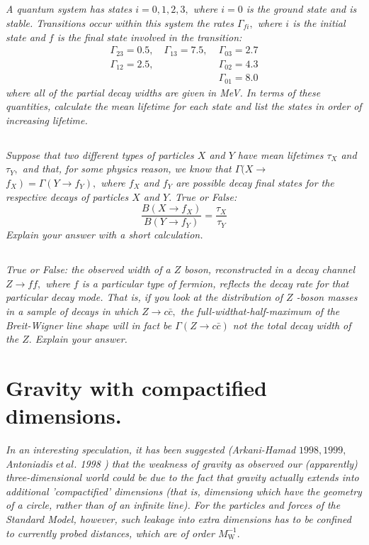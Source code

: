 \documentclass{article}
\begin{document}
\subsection{}
\textit{A quantum system has states $i=0,1,2,3,$ where $i=0$ is the ground state and is stable. Transitions occur within this system the rates $\Gamma_{f i},$ where $i$ is the initial state and $f$ is the final state involved in the transition:
$$
\begin{aligned}
\Gamma_{23}=0.5, \quad \Gamma_{13}=7.5, \;& \Gamma_{03}=2.7 \\
\Gamma_{12}=2.5, \; & \Gamma_{02}=4.3 \\
&\Gamma_{01}= 8.0
\end{aligned}
$$
where all of the partial decay widths are given in MeV. In terms of these quantities, calculate the mean lifetime for each state and list the states in order of increasing lifetime.}


\subsection{}
\textit{Suppose that two different types of particles $X$ and $Y$ have mean lifetimes $\tau_{X}$ and $\tau_{Y},$ and that, for some physics reason, we know that $\Gamma(X \rightarrow$ $\left.f_{X}\right)=\Gamma\left(Y \rightarrow f_{Y}\right),$ where $f_{X}$ and $f_{Y}$ are possible decay final states for the respective decays of particles $X$ and $Y .$ True or False:
$$
\frac{B\left(X \rightarrow f_{X}\right)}{B\left(Y \rightarrow f_{Y}\right)}=\frac{\tau_{X}}{\tau_{Y}}
$$
Explain your answer with a short calculation.}


\subsection{}
\textit{True or False: the observed width of a $Z$ boson, reconstructed in a decay channel $Z \rightarrow f f,$ where $f$ is a particular type of fermion, reflects the decay rate for that particular decay mode. That is, if you look at the distribution of $Z$ -boson masses in a sample of decays in which $Z \rightarrow c \bar{c},$ the full-widthat-half-maximum of the Breit-Wigner line shape will in fact be $\Gamma(Z \rightarrow c \bar{c})$ not the total decay width of the $Z .$ Explain your answer.}

\newpage

\section{Gravity with compactified dimensions.}
\textit{In an interesting speculation, it has been suggested (Arkani-Hamad $1998,1999,$ Antoniadis $e t\, al.$ 1998 ) that the weakness of gravity as observed our (apparently) three-dimensional world could be due to the fact that gravity actually extends into additional 'compactified' dimensions (that is, dimensiong which have the geometry of a circle, rather than of an infinite line). For the particles and forces of the Standard Model, however, such leakage into extra dimensions has to be confined to currently probed distances, which are of order $M_{\mathrm{W}}^{-1}.$}
\end{document}
